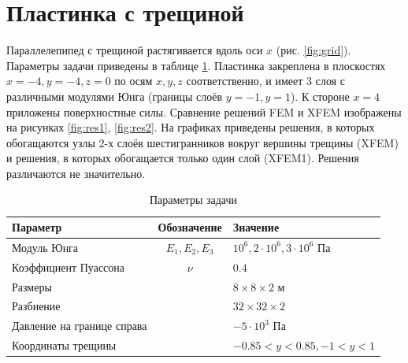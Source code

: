 \section{Пластинка с трещиной}
Параллелепипед с трещиной растягивается вдоль оси $x$ (рис. \ref{fig:grid}). Параметры задачи приведены в таблице \ref{tab:test1_parameters}. Пластинка закреплена в плоскостях $x = -4, y = -4, z = 0$ по осям $x, y, z$ соответственно, и имеет 3 слоя с различными модулями Юнга (границы слоёв $y=-1, y=1$). К стороне $x=4$ приложены поверхностные силы. Сравнение решений FEM и XFEM изображены на рисунках \ref{fig:res1}, \ref{fig:res2}. На графиках приведены решения, в которых обогащаются узлы 2-х слоёв шестигранников вокруг вершины трещины (XFEM) и решения, в которых обогащается только один слой (XFEM1). Решения различаются не значительно.
\begin{table}[h!]
	\caption{Параметры задачи}
	
	\begin{tabular}{|p{5.3cm}|c|p{7cm}|}
		
		\hline
		Параметр & Обозначение & Значение \\
		\hline
		Модуль Юнга & $E_1, E_2, E_3$& $10^{6}, 2\cdot 10^{6}, 3\cdot 10^{6}$ Па \\
		\hline
		Коэффициент Пуассона & $\nu$ & $0.4$ \\
		\hline
		Размеры &  & $8\times 8\times 2$ м\\
		\hline
		Разбиение &  & $32\times 32\times 2$ \\
		\hline
		Давление на границе справа &  &$-5\cdot 10^3$ Па \\
		\hline
		Координаты трещины&  &$-0.85<y<0.85, -1<y<1$\\
		\hline
	\end{tabular}
	\label{tab:test1_parameters}
\end{table}
